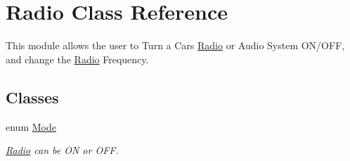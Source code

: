 \hypertarget{class_radio}{}\section{Radio Class Reference}
\label{class_radio}


This module allows the user to Turn a Car\textquotesingle{}s \hyperlink{class_radio}{Radio} or Audio System O\+N/\+O\+F\+F, and change the \hyperlink{class_radio}{Radio} Frequency.  


\subsection*{Classes}
\begin{DoxyCompactItemize}
\item 
enum \hyperlink{enum_radio_1_1_mode}{Mode}
\begin{DoxyCompactList}\small\item\em \hyperlink{class_radio}{Radio} can be O\+N or O\+F\+F. \end{DoxyCompactList}\end{DoxyCompactItemize}
